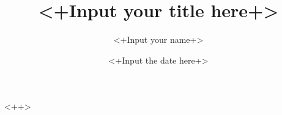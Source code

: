 \documentclass{beamer}
\title{<+Input your title here+>}
\author{<+Input your name+>}
\date{<+Input the date here+>}
\theoremstyle{definition}
\theoremstyle{remark}
\numberwithin{equation}{section}
\begin{document}
<++>




\end{document}
